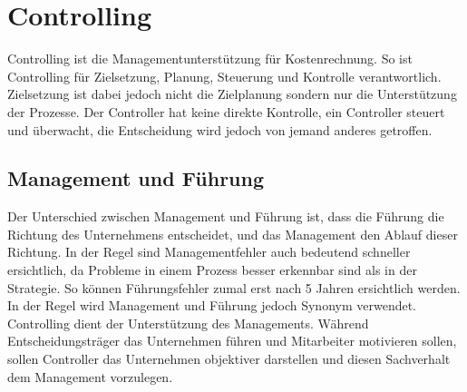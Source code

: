 \documentclass{article}
\begin{document}
	\section{Controlling}
	Controlling ist die Managementunterstützung für Kostenrechnung. So ist Controlling für Zielsetzung, Planung, Steuerung und Kontrolle verantwortlich. Zielsetzung ist dabei jedoch nicht die Zielplanung sondern nur die Unterstützung der Prozesse. Der Controller hat keine direkte Kontrolle, ein Controller steuert und überwacht, die Entscheidung wird jedoch von jemand anderes getroffen.
	\subsection{Management und Führung}
	Der Unterschied zwischen Management und Führung ist, dass die Führung die Richtung des Unternehmens entscheidet, und das Management den Ablauf dieser Richtung. In der Regel sind Managementfehler auch bedeutend schneller ersichtlich, da Probleme in einem Prozess besser erkennbar sind als in der Strategie. So können Führungsfehler zumal erst nach 5 Jahren ersichtlich werden. In der Regel wird Management und Führung jedoch Synonym verwendet. \\
	Controlling dient der Unterstützung des Managements. Während Entscheidungsträger das Unternehmen führen und Mitarbeiter motivieren sollen, sollen Controller das Unternehmen objektiver darstellen und diesen Sachverhalt dem Management vorzulegen.
	


	























  
\end{document}
